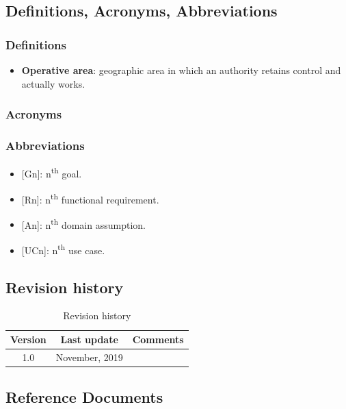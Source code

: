 \documentclass{article}
\begin{document}
				
		\subsection{Definitions, Acronyms, Abbreviations}
			\subsubsection{Definitions}
				\begin{itemize}
					\item \textbf{Operative area}: geographic area in which an authority retains  control and actually works.
				\end{itemize}
			\subsubsection{Acronyms}
			\subsubsection{Abbreviations}
				\begin{itemize}
					\item {[Gn]}: n\textsuperscript{th} goal.
					\item {[Rn]}: n\textsuperscript{th} functional requirement.
					\item {[An]}: n\textsuperscript{th} domain assumption.
					\item {[UCn]}: n\textsuperscript{th} use case.
				\end{itemize}
		\subsection{Revision history}
			\begin{table}[h]
				\centering
				\begin{tabular}{c c c}
					\hline
					\textbf{Version} & \textbf{Last update} & \textbf{Comments} \\ 
					\hline
					1.0 &  \nth{10} November, 2019  & \\
					\hline
				\end{tabular}
				\caption{Revision history}
				\label{fig:Revision history}
			\end{table}
		\subsection{Reference Documents}
\end{document}
